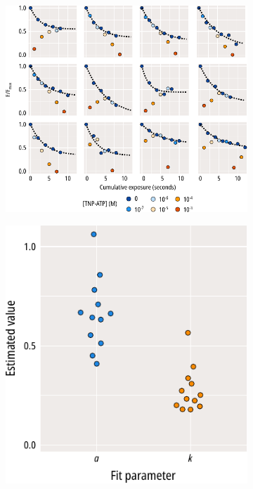 \begin{figure}[h]
	\centering
	\begin{subfigure}[t]{0.9\textwidth}
		\caption{}\label{ch3fig:bleaching_plots_1}
		\centering
		\includegraphics[width=\textwidth]{bleaching_plots_1.pdf}
	\end{subfigure}
	\vfill
	\begin{subfigure}[t]{0.45\textwidth}
		\caption{}\label{ch3fig:bleaching_terms_1}
		\centering
		\includegraphics[width=\textwidth]{bleaching_terms_1.pdf}

\end{subfigure}
\end{figure}
